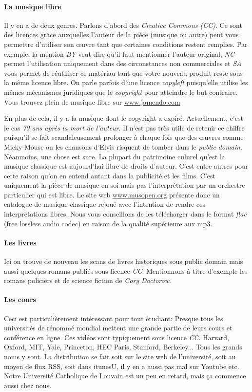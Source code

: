 \paragraph{La musique libre}
Il y en a de deux genres. Parlons d'abord des \textit{Creative Commons (CC)}. Ce sont des licences grâce auxquelles l'auteur de la pièce (musique ou autre) peut vous permettre
d'utiliser son \oe uvre tant que certaines conditions restent remplies. Par exemple, la mention \textit{BY} veut dire qu'il faut mentionner l'auteur original, \textit{NC} permet l'utilisation uniquement dans des circonstances non commerciales et \textit{SA} vous permet de réutiliser ce matériau tant que votre nouveau produit reste sous la même licence libre. On parle parfois d'une licence \textit{copyleft} puisqu'elle utilise les mêmes mécanismes juridiques que le \textit{copyright} pour atteindre le but contraire. Vous trouvez plein de musique libre sur \url{www.jamendo.com}

En plus de cela, il y a la musique dont le copyright a expiré. Actuellement, c'est le cas \textit{70 ans après la mort de l'auteur}.
Il n'est pas très utile de retenir ce chiffre puisqu'il se fait scandaleusement prolonger à chaque fois que des \oe uvres comme Micky Mouse ou les chansons d'Elvis risquent de tomber dans le \textit{public domain}.
Néanmoins, une chose est sure. La plupart du patrimoine culurel qu'est la musique classique est aujourd'hui libre de droits d'auteur.
C'est entre autres pour cette raison qu'on en entend autant dans la publicité et les films.
C'est uniquement la pièce de musique en soi mais pas l'interprétation par un orchestre particulier qui est libre.
Le site web \url{www.musopen.org} présente donc un catalogue de musique classique rejoué avec l'intention de rendre ces interprétations libres.
Nous vous conseillons de les télécharger dans le format \textit{flac} (free lossless audio codec) en raison de la qualité supérieure aux mp3.

\paragraph{Les livres}
Ici on trouve de nouveau les scans de livres historiques sous public domain mais aussi quelques romans publiés sous licence \textit{CC}.
Mentionnons à titre d'exemple les romans policiers et de science fiction de \textit{Cory Doctorow}.

\paragraph{Les cours}
Ceci est particulièrement intéressant pour tout étudiant: Presque tous les universités de rénommé mondial mettent une grande partie de leurs cours et conférence en ligne.
Ces vidéos sont typiquement sous licence \textit{CC}. Harvard, Oxford, MIT, Yale, Princeton, HEC Paris, Stanford, Berkeley... Tous les grands noms y sont.
La distribution se fait soit sur le site web de l'université, soit au moyen de flux RSS, soit dans itunesU, il y en a aussi pas mal sur Youtube etc.
Notre Université Catholique de Louvain est un peu en retard, mais ça commence aussi chez nous.

